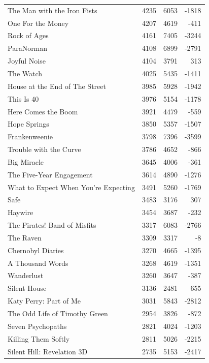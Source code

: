 \documentclass[10pt]{article}
\begin{document}
\begin{figure}[ht]
\begin{tabular}{l|r|r|r}
            The Man with the Iron Fists & 4235 & 6053 & -1818 \\
            One For the Money & 4207 & 4619 & -411 \\
            Rock of Ages & 4161 & 7405 & -3244 \\
            ParaNorman & 4108 & 6899 & -2791 \\
            Joyful Noise & 4104 & 3791 & 313 \\
            The Watch & 4025 & 5435 & -1411 \\
            House at the End of The Street & 3985 & 5928 & -1942 \\
            This Is 40 & 3976 & 5154 & -1178 \\
            Here Comes the Boom & 3921 & 4479 & -559 \\
            Hope Springs & 3850 & 5357 & -1507 \\
            Frankenweenie & 3798 & 7396 & -3599 \\
            Trouble with the Curve & 3786 & 4652 & -866 \\
            Big Miracle & 3645 & 4006 & -361 \\
            The Five-Year Engagement & 3614 & 4890 & -1276 \\
            What to Expect When You're Expecting & 3491 & 5260 & -1769 \\
            Safe & 3483 & 3176 & 307 \\
            Haywire & 3454 & 3687 & -232 \\
            The Pirates! Band of Misfits & 3317 & 6083 & -2766 \\
            The Raven & 3309 & 3317 & -8 \\
            Chernobyl Diaries & 3270 & 4665 & -1395 \\
            A Thousand Words & 3268 & 4619 & -1351 \\
            Wanderlust & 3260 & 3647 & -387 \\
            Silent House & 3136 & 2481 & 655 \\
            Katy Perry: Part of Me & 3031 & 5843 & -2812 \\
            The Odd Life of Timothy Green & 2954 & 3826 & -872 \\
            Seven Psychopaths & 2821 & 4024 & -1203 \\
            Killing Them Softly & 2811 & 5026 & -2215 \\
            Silent Hill: Revelation 3D & 2735 & 5153 & -2417 \\

\end{tabular}
\end{figure}
\end{document}
